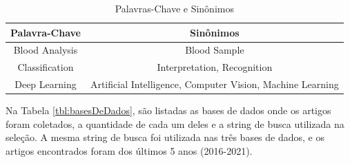 \begin{table}[!htb]
	\centering
	\caption{Palavras-Chave e Sinônimos}
	\label{tbl:palavrasChave}
	\begin{tabular}{|c|c|}
		\hline
		\textbf{Palavra-Chave} & \textbf{Sinônimos}                                        \\ \hline
		Blood Analysis         & Blood Sample                                               \\ \hline
		Classification         & Interpretation, Recognition                                \\ \hline
		Deep Learning          & Artificial Intelligence, Computer Vision, Machine Learning \\ \hline
	\end{tabular}
	\vspace{6pt}
\end{table}

Na Tabela \ref{tbl:basesDeDados}, são listadas as bases de dados onde os artigos foram coletados, a quantidade de cada um deles e a string de busca utilizada na seleção. A mesma string de busca foi utilizada nas três bases de dados, e os artigos encontrados foram dos últimos 5 anos (2016-2021).

